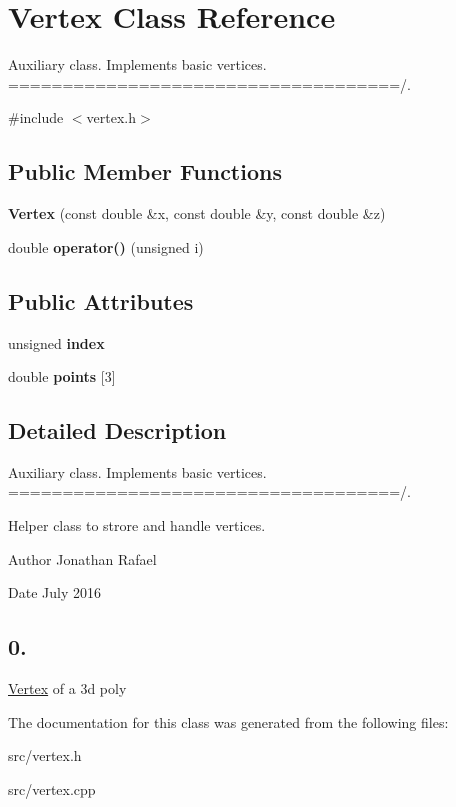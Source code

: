 \hypertarget{class_vertex}{}\section{Vertex Class Reference}
\label{class_vertex}


Auxiliary class. Implements basic vertices. ====================================/.  




{\ttfamily \#include $<$vertex.\+h$>$}

\subsection*{Public Member Functions}
\begin{DoxyCompactItemize}
\item 
\mbox{\label{class_vertex_abd9cebad3eacc656ea6a9027c1d96b8d}} 
{\bfseries Vertex} (const double \&x, const double \&y, const double \&z)
\item 
\mbox{\label{class_vertex_a43d933c801f9d4deff63b0ebefa57dd6}} 
double {\bfseries operator()} (unsigned i)
\end{DoxyCompactItemize}
\subsection*{Public Attributes}
\begin{DoxyCompactItemize}
\item 
\mbox{\label{class_vertex_a0370aebecc487a440882a2a8b44d0501}} 
unsigned {\bfseries index}
\item 
\mbox{\label{class_vertex_a3df67e6d67e5fd518b9ea215722b187f}} 
double {\bfseries points} \mbox{[}3\mbox{]}
\end{DoxyCompactItemize}


\subsection{Detailed Description}
Auxiliary class. Implements basic vertices. ====================================/. 

Helper class to strore and handle vertices. \begin{DoxyAuthor}{Author}
Jonathan Rafael 
\end{DoxyAuthor}
\begin{DoxyDate}{Date}
July 2016 \subsection*{0. }
\end{DoxyDate}


\hyperlink{class_vertex}{Vertex} of a 3d poly 

The documentation for this class was generated from the following files\+:\begin{DoxyCompactItemize}
\item 
src/vertex.\+h\item 
src/vertex.\+cpp\end{DoxyCompactItemize}

